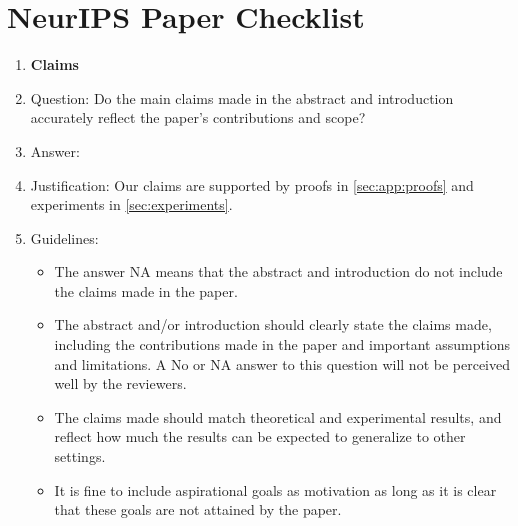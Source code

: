 \documentclass{article}
\theoremstyle{plain}
\theoremstyle{definition}
\theoremstyle{remark}
\theoremstyle{remark}
\begin{document}
\clearpage

\section*{NeurIPS Paper Checklist}



\begin{enumerate}

\item {\bf Claims}
    \item[] Question: Do the main claims made in the abstract and introduction accurately reflect the paper's contributions and scope?
    \item[] Answer: \answerYes{}
    \item[] Justification: Our claims are supported by proofs in \autoref{sec:app:proofs} and experiments in \autoref{sec:experiments}.
    \item[] Guidelines:
    \begin{itemize}
        \item The answer NA means that the abstract and introduction do not include the claims made in the paper.
        \item The abstract and/or introduction should clearly state the claims made, including the contributions made in the paper and important assumptions and limitations. A No or NA answer to this question will not be perceived well by the reviewers. 
        \item The claims made should match theoretical and experimental results, and reflect how much the results can be expected to generalize to other settings. 
        \item It is fine to include aspirational goals as motivation as long as it is clear that these goals are not attained by the paper. 
    \end{itemize}


\end{enumerate}
\end{document}

